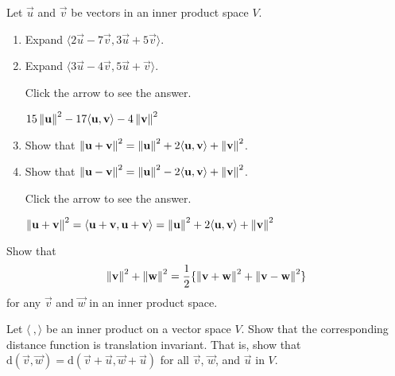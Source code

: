 \documentclass{ximera}
\begin{document}
\begin{problem}\label{prob:inner_prod_22}
Let $\vec{u}$ and $\vec{v}$ be vectors in an inner product space $V$.

\begin{enumerate} 
\item Expand $\langle2\vec{u} - 7\vec{v}, 3\vec{u} + 5\vec{v} \rangle$.

\item Expand $\langle3\vec{u} - 4\vec{v}, 5\vec{u} + \vec{v} \rangle$.

Click the arrow to see the answer.
\begin{expandable}{}{}
$15\left\lVert\mathbf{u}\right\rVert^{2} - 17 \langle \mathbf{u}, \mathbf{v} \rangle - 4\left\lVert\mathbf{v}\right\rVert^{2}$
\end{expandable}

\item Show that $\left\lVert \mathbf{u} + \mathbf{v} \right\rVert ^2 = \left\lVert \mathbf{u} \right\rVert ^2 + 2 \langle \mathbf{u}, \mathbf{v} \rangle + \left\lVert \mathbf{v} \right\rVert ^2 $.

\item Show that $\left\lVert \mathbf{u} - \mathbf{v} \right\rVert ^2 = \left\lVert \mathbf{u} \right\rVert ^2 - 2 \langle \mathbf{u}, \mathbf{v} \rangle +
\left\lVert \mathbf{v} \right\rVert ^2$.

Click the arrow to see the answer.
\begin{expandable}{}{}
$\left\lVert\mathbf{u} + \mathbf{v}\right\rVert^{2} = \langle \mathbf{u} + \mathbf{v}, \mathbf{u} + \mathbf{v} \rangle = \left\lVert\mathbf{u}\right\rVert^{2} + 2\langle \mathbf{u}, \mathbf{v}\rangle + \left\lVert\mathbf{v}\right\rVert^{2}$
\end{expandable}
\end{enumerate}

\end{problem}

\begin{problem}\label{prob:inner_prod_23}
Show that
\begin{equation*}
\left\lVert \mathbf{v} \right\rVert ^2 +
\left\lVert \mathbf{w} \right\rVert ^2 = \frac{1}{2} \{
\left\lVert \mathbf{v} + \mathbf{w} \right\rVert ^2 +
\left\lVert \mathbf{v} - \mathbf{w} \right\rVert ^2\}
\end{equation*}
for any $\vec{v}$ and $\vec{w}$ in an inner product space.
\end{problem}

\begin{problem}\label{prob:inner_prod_24}
Let $\langle\ , \rangle$ be an inner product on a vector space $V$. Show that the corresponding distance function is translation invariant. That is, show that \newline $\mbox{d}(\vec{v}, \vec{w}) = \mbox{d}(\vec{v} + \vec{u}, \vec{w} + \vec{u})$ for all $\vec{v}$, $\vec{w}$, and $\vec{u}$ in $V$.
\end{problem}
\end{document}
